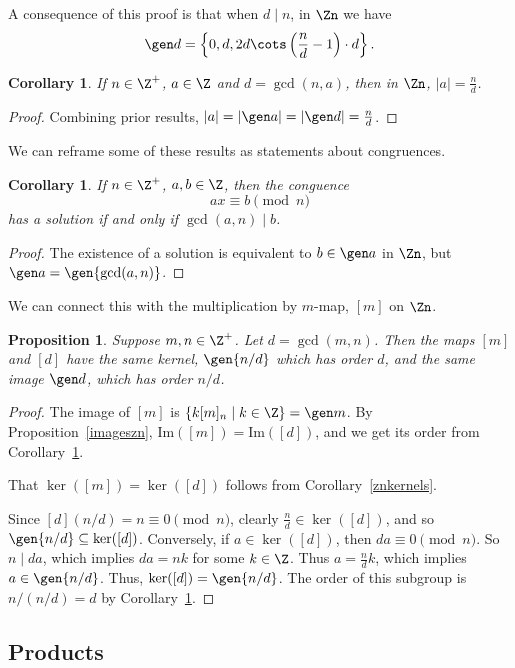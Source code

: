 \documentclass[12pt]{amsart}
\renewcommand{\Im}{\textrm{Im}} %
\theoremstyle{plain}
\newtheorem{prop}[thm]{Proposition}
\newtheorem{cor}[thm]{Corollary}
\theoremstyle{definition}
\theoremstyle{remark}
\begin{document}
  A consequence of this proof is that when $d\mid n$, in $\Zn$ we have
  \[ \gen d = \left\{0, d, 2d\cots \left(\frac n d-1\right) \cdot d\right\}.\]

\begin{cor}\label{ordercor}
  If $n\in\Z^+$, $a\in \Z$ and $d=\gcd(n,a)$, then in $\Zn$,
  $|a|=\frac nd$.
\end{cor}
\begin{proof}
  Combining prior results, $|a|=|\gen a| = |\gen d| = \frac nd$.
\end{proof}

We can reframe some of these results as statements about congruences.
\begin{cor}
  If $n\in\Z^+$, $a,b\in\Z$, then the conguence
  \[  ax\equiv b\pmod n\]
  has a solution if and only if $\gcd(a,n)\mid b$.
\end{cor}
\begin{proof}
  The existence of a solution is equivalent to $b\in\gen a$ in $\Zn$,
  but $\gen a = \gen{\gcd(a,n)}$.
\end{proof}

We can connect this with the multiplication by $m$-map, $[m]$ on
$\Zn$.
\begin{prop}
  Suppose $m,n\in\Z^+$.  Let $d=\gcd(m,n)$.  Then the maps $[m]$ and
  $[d]$ have the same kernel, $\gen{n/d}$ which has order $d$, and the
  same image $\gen d$, which has order $n/d$.
\end{prop}
\begin{proof}
  The image of $[m]$ is $\{k[m]_n\mid k\in\Z\}=\gen m$.  By
  Proposition~\ref{imageszn}, $\Im([m])=\Im([d])$, and we get its
  order from Corollary~\ref{ordercor}.

  That $\ker([m])=\ker([d])$ follows from Corollary~\ref{znkernels}.
  
  Since $[d](n/d)=n\equiv 0\pmod n$, clearly $\frac n d \in
  \ker([d])$, and so $\gen{n/d}\subseteq \ker([d])$.  Conversely, if
  $a\in\ker([d])$, then $da\equiv 0\pmod n$.  So $n\mid da$, which
  implies $da=nk$ for some $k\in\Z$.  Thus $a=\frac n d k$, which
  implies $a\in\gen{n/d}$.  Thus, $\ker([d])=\gen{n/d}$.  The order of
  this subgroup is $n/(n/d)=d$ by Corollary~\ref{ordercor}.
\end{proof}

\subsection{Products}
\end{document}
